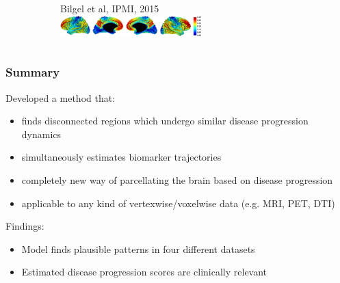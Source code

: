 \documentclass[8pt,xcolor=table]{beamer}
\begin{document}
\begin{frame}
\begin{columns}[T]
\begin{column}{.4\textwidth}
\begin{figure}[h]
      \begin{subfigure}[b]{0.8\textwidth}
      \centering
      \vspace{1em}
      Bilgel et al, IPMI, 2015
      \includegraphics[width=0.6\textwidth,trim=210 0 140 0,clip]{bilgel_neuroimage}
      \end{subfigure}
      
      
      \end{figure}
    \end{column}
  \end{columns}

\end{frame}

\begin{frame}
\frametitle{Summary}

Developed a method that:
\begin{itemize}
\item finds disconnected regions which undergo similar disease progression dynamics
\item simultaneously estimates biomarker trajectories
\item completely new way of parcellating the brain based on disease progression
\item applicable to any kind of vertexwise/voxelwise data (e.g. MRI, PET, DTI)
\end{itemize}



\vfill

Findings:
\begin{itemize}
\item Model finds plausible patterns in four different datasets
\item Estimated disease progression scores are clinically relevant
\end{itemize}

 
\end{frame}
\end{document}
